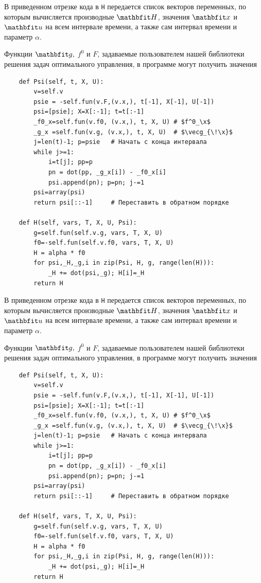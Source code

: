 \documentclass[a4paper,14pt, openany, twoside, final]{extbook} %
\begin{document}
В приведенном отрезке кода в \texttt{H} передается список векторов переменных, по которым вычисляется производные $\vecH$, значения $\vecx$ и $\vecu$ на всем интервале времени, а также сам интервал времени и параметр $\alpha$.

Функции $\vecg,$ $f^0$ и $F$, задаваемые пользователем нашей библиотеки решения задач оптимального управления, в программе могут получить значения

\begin{verbatim}
    def Psi(self, t, X, U):
        v=self.v
        psie = -self.fun(v.F,(v.x,), t[-1], X[-1], U[-1])
        psi=[psie]; X=X[:-1]; t=t[:-1]
        _f0_x=self.fun(v.f0, (v.x,), t, X, U) # $f^0_\x$
        _g_x =self.fun(v.g, (v.x,), t, X, U)  # $\vecg_{\!\x}$
        j=len(t)-1; p=psie   # Начать с конца интервала
        while j>=1:
            i=t[j]; pp=p
            pn = dot(pp, _g_x[i]) - _f0_x[i]
            psi.append(pn); p=pn; j-=1
        psi=array(psi)
        return psi[::-1]     # Переставить в обратном порядке

    def H(self, vars, T, X, U, Psi):
        g=self.fun(self.v.g, vars, T, X, U)
        f0=-self.fun(self.v.f0, vars, T, X, U)
        H = alpha * f0
        for psi,_H,_g,i in zip(Psi, H, g, range(len(H))):
            _H += dot(psi,_g); H[i]=_H
        return H
\end{verbatim}

В приведенном отрезке кода в \texttt{H} передается список векторов переменных, по которым вычисляется производные $\vecH$, значения $\vecx$ и $\vecu$ на всем интервале времени, а также сам интервал времени и параметр $\alpha$.

Функции $\vecg,$ $f^0$ и $F$, задаваемые пользователем нашей библиотеки решения задач оптимального управления, в программе могут получить значения

\begin{verbatim}
    def Psi(self, t, X, U):
        v=self.v
        psie = -self.fun(v.F,(v.x,), t[-1], X[-1], U[-1])
        psi=[psie]; X=X[:-1]; t=t[:-1]
        _f0_x=self.fun(v.f0, (v.x,), t, X, U) # $f^0_\x$
        _g_x =self.fun(v.g, (v.x,), t, X, U)  # $\vecg_{\!\x}$
        j=len(t)-1; p=psie   # Начать с конца интервала
        while j>=1:
            i=t[j]; pp=p
            pn = dot(pp, _g_x[i]) - _f0_x[i]
            psi.append(pn); p=pn; j-=1
        psi=array(psi)
        return psi[::-1]     # Переставить в обратном порядке

    def H(self, vars, T, X, U, Psi):
        g=self.fun(self.v.g, vars, T, X, U)
        f0=-self.fun(self.v.f0, vars, T, X, U)
        H = alpha * f0
        for psi,_H,_g,i in zip(Psi, H, g, range(len(H))):
            _H += dot(psi,_g); H[i]=_H
        return H
\end{verbatim}
\end{document}
